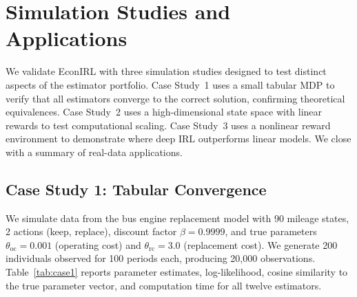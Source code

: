 \section{Simulation Studies and Applications}
\label{sec:experiments}

We validate EconIRL with three simulation studies designed to test distinct aspects of the estimator portfolio.
Case Study~1 uses a small tabular MDP to verify that all estimators converge to the correct solution, confirming theoretical equivalences.
Case Study~2 uses a high-dimensional state space with linear rewards to test computational scaling.
Case Study~3 uses a nonlinear reward environment to demonstrate where deep IRL outperforms linear models.
We close with a summary of real-data applications.


\subsection{Case Study 1: Tabular Convergence}
\label{sec:case1}

We simulate data from the \citet{rust1987} bus engine replacement model with 90 mileage states, 2 actions (keep, replace), discount factor $\beta = 0.9999$, and true parameters $\theta_{\text{oc}} = 0.001$ (operating cost) and $\theta_{\text{rc}} = 3.0$ (replacement cost).
We generate 200 individuals observed for 100 periods each, producing 20{,}000 observations.
Table~\ref{tab:case1} reports parameter estimates, log-likelihood, cosine similarity to the true parameter vector, and computation time for all twelve estimators.

